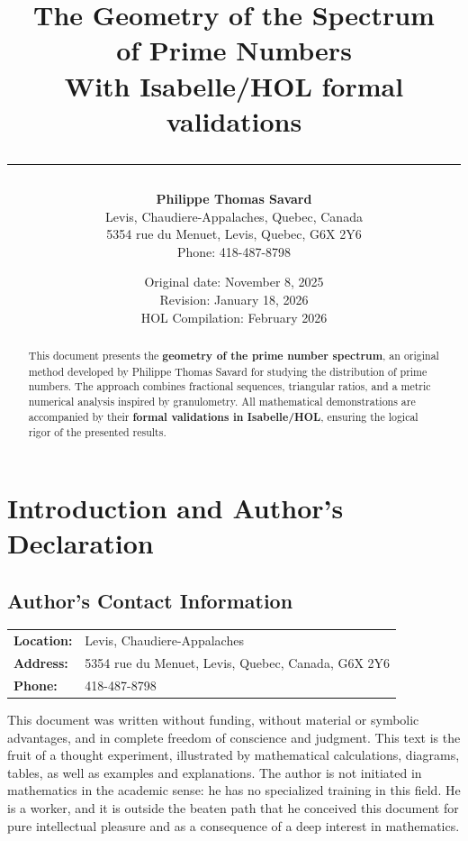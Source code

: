 \documentclass[a4paper,11pt]{article}
\title{
    \vspace{-2cm}
    {\LARGE \textbf{The Geometry of the Spectrum}}\\[0.5cm]
    {\LARGE \textbf{of Prime Numbers}}\\[1cm]
    {\large With Isabelle/HOL formal validations}\\[0.5cm]
    \rule{\textwidth}{0.4pt}
}
\author{
    \textbf{Philippe Thomas Savard}\\[0.3cm]
    \small Levis, Chaudiere-Appalaches, Quebec, Canada\\
    \small 5354 rue du Menuet, Levis, Quebec, G6X 2Y6\\
    \small Phone: 418-487-8798
}
\date{
    \vspace{0.5cm}
    Original date: November 8, 2025\\
    Revision: January 18, 2026\\
    HOL Compilation: February 2026
}
\begin{document}
\maketitle
\thispagestyle{empty}

\vspace{1cm}

\begin{abstract}
This document presents the \textbf{geometry of the prime number spectrum}, an original method developed by Philippe Thomas Savard for studying the distribution of prime numbers. The approach combines fractional sequences, triangular ratios, and a metric numerical analysis inspired by granulometry. All mathematical demonstrations are accompanied by their \textbf{formal validations in Isabelle/HOL}, ensuring the logical rigor of the presented results.
\end{abstract}

\newpage
\tableofcontents
\newpage

\section{Introduction and Author's Declaration}

\subsection{Author's Contact Information}

\begin{center}
\begin{tabular}{ll}
\textbf{Location:} & Levis, Chaudiere-Appalaches \\
\textbf{Address:} & 5354 rue du Menuet, Levis, Quebec, Canada, G6X 2Y6 \\
\textbf{Phone:} & 418-487-8798 \\
\end{tabular}
\end{center}

\vspace{0.5cm}

This document was written without funding, without material or symbolic advantages, and in complete freedom of conscience and judgment. This text is the fruit of a thought experiment, illustrated by mathematical calculations, diagrams, tables, as well as examples and explanations. The author is not initiated in mathematics in the academic sense: he has no specialized training in this field. He is a worker, and it is outside the beaten path that he conceived this document for pure intellectual pleasure and as a consequence of a deep interest in mathematics.
\end{document}
